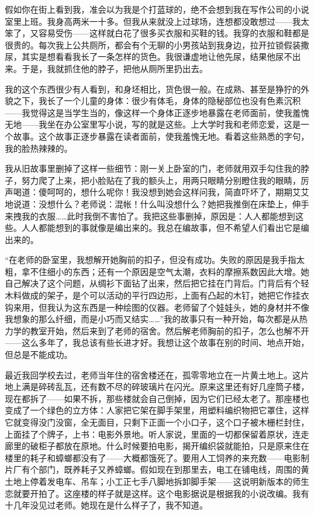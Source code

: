 假如你在街上看到我，准会以为我是个打蓝球的，绝不会想到我在写作公司的小说室里上班。我身高两米一十多。但我从来就没上过球场，连想都没敢想过——我太笨了，又容易受伤——这样就白花了很多买衣服和买鞋的钱。我穿的衣服和鞋都是很贵的。每次我上公共厕所，都会有个无聊的小男孩站到我身边，拉开拉锁假装撒尿，其实是想看看我长了一条怎样的货色。我很谦虚地让他先尿，结果他尿不出来。于是，我就抓住他的脖子，把他从厕所里扔出去。 

我的这个东西很少有人看到，和身坯相比，货色很一般。在成熟、甚至是狰狞的外貌之下，我长了一个儿童的身体：很少有体毛，身体的隐秘部位也没有色素沉积——我觉得这是当学生当的，像这样一个身体正逐步地暴露在老师面前，使我羞愧无地——我坐在办公室里写小说，写的就是这些。上大学时我和老师恋爱，这是一个故事。这个故事正逐步暴露在读者面前，使我羞愧无地。看着这些熟悉的字句，我的脸热辣辣的。 

我从旧故事里删掉了这样一些细节：刚一关上卧室的门，老师就用双手勾住我的脖子，努力爬了上来，把小脸贴在了我的额头上，用两只眼睛分别瞪住我的眼睛，厉声喝道：傻呵呵的，想什么呢你！我没想到她会这样问我，简直吓坏了，期期艾艾地说道：没想什么？老师说：混帐！什么叫没想什么？她把我推倒在床垫上，伸手来拽我的衣服……此时我倒不害怕了。我把这些事删掉，原因是：人人都能想到这些。人人都能想到的事就像是编出来的。我总在编故事，但不希望人们看出它是编出来的。 

“在老师的卧室里，我想解开她胸前的扣子，但没有成功。失败的原因是我手指太粗，拿不住细小的东西；还有一个原因是空气太潮，衣料的摩擦系数因此大增。她自己解决了这个问题，从绸衫下面钻了出来，然后把它挂在门背后。门背后有个轻木料做成的架子，是个可以活动的平行四边形，上面有凸起的木钉，她把它作挂衣钩来用，但我认为这东西是一种绘图的仪器。老师留了个娃娃头，她的身材并不像我想象的那么纤细，而是小巧而又结实……”我的故事只有一种开始，每次都是从热力学的教室开始，然后来到了老师的宿舍。然后解老师胸前的扣子，怎么也解不开——这么多年了，我总该有些长进才好。我想让这个故事在别的时间、地点开始，但总是不能成功。 

最近我回学校去过，老师当年住的宿舍楼还在，孤零零地立在一片黄土地上。这片地上满是碎砖乱瓦，还有数不尽的碎玻璃片在闪光。原来这里还有好几座筒子楼，现在都拆了——如果不拆，那些楼就会自己倒掉，因为它们已经太老了。那座楼也变成了一个绿色的立方体：人家把它架在脚手架里，用塑料编织物把它罩住，这样它就变得没门没窗，全无面目，只剩下正面一个小口子，这个口子被木栅栏封住，上面挂了个牌子，上书：电影外景地。听人家说，里面的一切都保留着原状，连走廊里的破柜子都放在原地。什么时候要拍电影，揭开编织袋就能拍，只是原来住在楼里的耗子和蟑螂都没有了——大概都饿死了。要用人工饲养的来充数——电影制片厂有个部门，既养耗子又养蟑螂。假如现在到那里去，电工在铺电线，周围的黄土地上停着发电车、吊车；小工正七手八脚地拆卸脚手架——这说明新版本的师生恋就要开拍了。这座楼的样子就是这样。这个电影据说是根据我的小说改编。我有十几年没见过老师。她现在是什么样子了，我不知道。 

